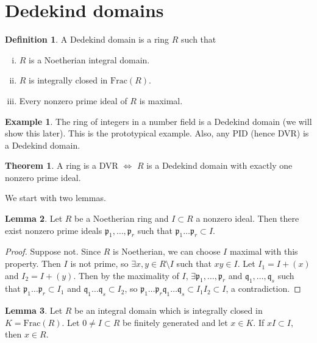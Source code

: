 \documentclass{article}
\theoremstyle{definition}
\newtheorem{theorem}{Theorem}[section]
\newtheorem{lemma}[theorem]{Lemma}
\newtheorem{example}{Example}[section]
\newtheorem{defn}{Definition}[section]
\begin{document}
\section{Dedekind domains}
\begin{defn}
    A Dedekind domain is a ring $R$ such that 
    \begin{enumerate}[(i)]
        \item $R$ is a Noetherian integral domain.
        \item $R$ is integrally closed in $\text{Frac}(R)$.
        \item Every nonzero prime ideal of $R$ is maximal.
    \end{enumerate}
\end{defn}
\begin{example}
    The ring of integers in a number field is a Dedekind domain (we will show this later). This is the prototypical example. Also, any PID (hence DVR) is a Dedekind domain.
\end{example}
\begin{theorem}\label{theorem9.1}
    A ring is a DVR $\iff$ $R$ is a Dedekind domain with exactly one nonzero prime ideal.
\end{theorem}
We start with two lemmas.
\begin{lemma}\label{lemma9.2}
    Let $R$ be a Noetherian ring and $I \subset R$ a nonzero ideal. Then there exist nonzero prime ideals $\mathfrak{p}_1,\ldots,\mathfrak{p}_r$ such that $\mathfrak{p}_1\ldots \mathfrak{p}_r \subset I$.
\end{lemma}
\begin{proof}
    Suppose not. Since $R$ is Noetherian, we can choose $I$ maximal with this property. Then $I$ is not prime, so $\exists x,y \in R\setminus I$ such that $xy \in I$. Let $I_1 = I + (x)$ and $I_2 = I + (y)$. Then by the maximality of $I$, $\exists \mathfrak{p}_1,\ldots,\mathfrak{p}_r$ and $\mathfrak{q}_1,\ldots,\mathfrak{q}_s$ such that $\mathfrak{p}_1\ldots \mathfrak{p}_r \subset I_1$ and $\mathfrak{q_1}\ldots \mathfrak{q}_s \subset I_2$, so $\mathfrak{p}_1 \ldots \mathfrak{p}_r \mathfrak{q}_1 \ldots \mathfrak{q}_s \subset I_1 I_2 \subset I$, a contradiction.
\end{proof}
\begin{lemma}\label{lemma9.3}
    Let $R$ be an integral domain which is integrally closed in $K =\text{Frac}(R)$. Let $0 \neq I \subset R$ be finitely generated and let $x \in K$. If $x I \subset I$, then $x \in R$.
\end{lemma}
\end{document}
